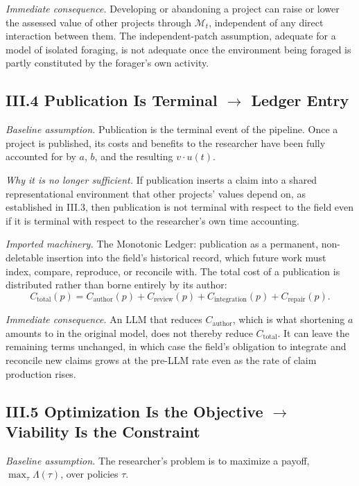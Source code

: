 \documentclass[11pt]{article}
\begin{document}
\textit{Immediate consequence.} Developing or abandoning a project can raise or lower the assessed value of other projects through $\mathcal{M}_t$, independent of any direct interaction between them. The independent-patch assumption, adequate for a model of isolated foraging, is not adequate once the environment being foraged is partly constituted by the forager's own activity.

\subsection*{III.4 \quad Publication Is Terminal $\rightarrow$ Ledger Entry}

\textit{Baseline assumption.} Publication is the terminal event of the pipeline. Once a project is published, its costs and benefits to the researcher have been fully accounted for by $a$, $b$, and the resulting $v \cdot u(t)$.

\textit{Why it is no longer sufficient.} If publication inserts a claim into a shared representational environment that other projects' values depend on, as established in III.3, then publication is not terminal with respect to the field even if it is terminal with respect to the researcher's own time accounting.

\textit{Imported machinery.} The Monotonic Ledger: publication as a permanent, non-deletable insertion into the field's historical record, which future work must index, compare, reproduce, or reconcile with. The total cost of a publication is distributed rather than borne entirely by its author:
\[
C_{\text{total}}(p) = C_{\text{author}}(p) + C_{\text{review}}(p) + C_{\text{integration}}(p) + C_{\text{repair}}(p).
\]

\textit{Immediate consequence.} An LLM that reduces $C_{\text{author}}$, which is what shortening $a$ amounts to in the original model, does not thereby reduce $C_{\text{total}}$. It can leave the remaining terms unchanged, in which case the field's obligation to integrate and reconcile new claims grows at the pre-LLM rate even as the rate of claim production rises.

\subsection*{III.5 \quad Optimization Is the Objective $\rightarrow$ Viability Is the Constraint}

\textit{Baseline assumption.} The researcher's problem is to maximize a payoff, $\max_\tau \Lambda(\tau)$, over policies $\tau$.
\end{document}
